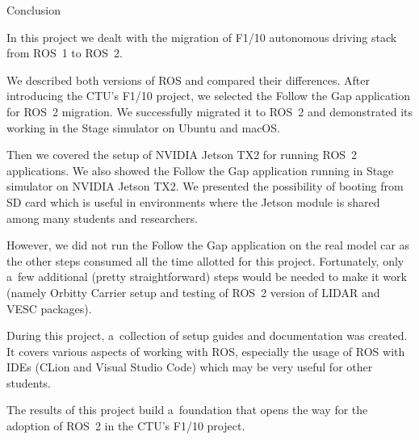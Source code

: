 \chap[conclusion] Conclusion

In this project we dealt with the migration of F1/10 autonomous driving stack from ROS~1 to ROS~2.

We described both versions of ROS and compared their differences. After introducing the CTU's F1/10 project,
we selected the Follow the Gap application for ROS~2 migration. We successfully migrated it to ROS~2
and demonstrated its working in the Stage simulator on Ubuntu and macOS.

Then we covered the setup of NVIDIA Jetson TX2 for running ROS~2 applications.
We also showed the Follow the Gap application running in Stage simulator on NVIDIA Jetson TX2.
We presented the possibility of booting from SD card which is useful in environments where the Jetson module
is shared among many students and researchers.

However, we did not run the Follow the Gap application on the real model car as the other steps consumed all the time
allotted for this project. Fortunately, only a~few additional (pretty straightforward) steps would be needed
to make it work (namely Orbitty Carrier setup and testing of ROS~2 version of LIDAR and VESC packages).

During this project, a~collection of setup guides and documentation was created. It covers various aspects
of working with ROS, especially the usage of ROS with IDEs (CLion and Visual Studio Code) which may be very useful
for other students.

The results of this project build a~foundation that opens the way for the adoption of ROS~2 in the CTU's F1/10 project.



